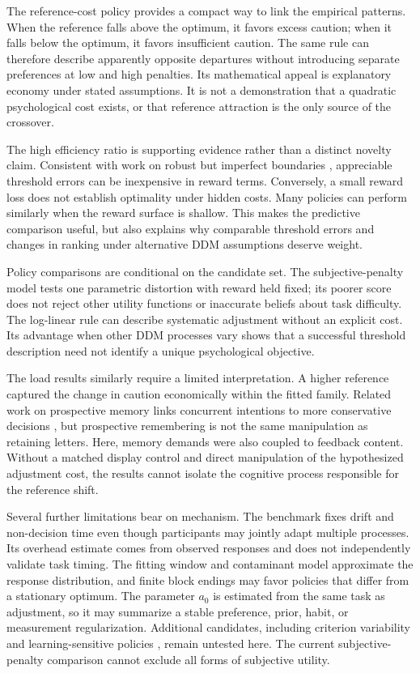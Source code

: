 \documentclass[10pt,letterpaper]{article}
\begin{document}
The reference-cost policy provides a compact way to link the empirical patterns. When the reference falls above the optimum, it favors excess caution; when it falls below the optimum, it favors insufficient caution. The same rule can therefore describe apparently opposite departures without introducing separate preferences at low and high penalties. Its mathematical appeal is explanatory economy under stated assumptions. It is not a demonstration that a quadratic psychological cost exists, or that reference attraction is the only source of the crossover.

The high efficiency ratio is supporting evidence rather than a distinct novelty claim. Consistent with work on robust but imperfect boundaries \citep{malhotra2017}, appreciable threshold errors can be inexpensive in reward terms. Conversely, a small reward loss does not establish optimality under hidden costs. Many policies can perform similarly when the reward surface is shallow. This makes the predictive comparison useful, but also explains why comparable threshold errors and changes in ranking under alternative DDM assumptions deserve weight.

Policy comparisons are conditional on the candidate set. The subjective-penalty model tests one parametric distortion with reward held fixed; its poorer score does not reject other utility functions or inaccurate beliefs about task difficulty. The log-linear rule can describe systematic adjustment without an explicit cost. Its advantage when other DDM processes vary shows that a successful threshold description need not identify a unique psychological objective.

The load results similarly require a limited interpretation. A higher reference captured the change in caution economically within the fitted family. Related work on prospective memory links concurrent intentions to more conservative decisions \citep{heathcote2015}, but prospective remembering is not the same manipulation as retaining letters. Here, memory demands were also coupled to feedback content. Without a matched display control and direct manipulation of the hypothesized adjustment cost, the results cannot isolate the cognitive process responsible for the reference shift.

Several further limitations bear on mechanism. The benchmark fixes drift and non-decision time even though participants may jointly adapt multiple processes. Its overhead estimate comes from observed responses and does not independently validate task timing. The fitting window and contaminant model approximate the response distribution, and finite block endings may favor policies that differ from a stationary optimum. The parameter $a_0$ is estimated from the same task as adjustment, so it may summarize a stable preference, prior, habit, or measurement regularization. Additional candidates, including criterion variability and learning-sensitive policies \citep{benjamin2009,masis2023}, remain untested here. The current subjective-penalty comparison cannot exclude all forms of subjective utility.
\end{document}
